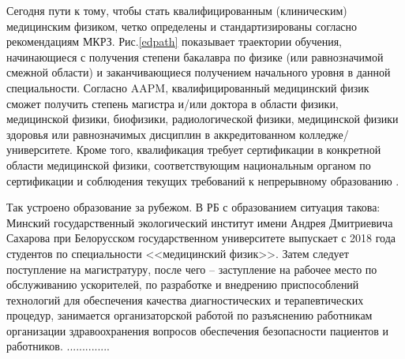 \documentclass[a4paper,10pt]{extarticle}
\begin{document}
Сегодня пути к тому, чтобы стать квалифицированным (клиническим) медицинским физиком, четко определены и стандартизированы согласно рекомендациям МКРЗ. Рис.\ref{edpath} показывает траектории обучения, начинающиеся с получения степени бакалавра по физике (или равнозначимой смежной области) и заканчивающиеся получением начального уровня в данной специальности.
Согласно AAPM, квалифицированный медицинский физик сможет получить степень магистра и/или доктора в области физики, медицинской физики, биофизики, радиологической физики, медицинской физики здоровья или равнозначимых дисциплин в аккредитованном колледже/университете. Кроме того, квалификация требует сертификации в конкретной области медицинской физики, соответствующим национальным органом по сертификации и соблюдения текущих требований к непрерывному образованию \cite{AAPM 2016b}. 

Так устроено образование за рубежом. В РБ с образованием ситуация такова: Минский государственный экологический институт имени Андрея Дмитриевича Сахарова при Белорусском государственном университете выпускает с 2018 года студентов по специальности <<медицинский физик>>. Затем следует поступление на магистратуру, после чего -- заступление на рабочее место по обслуживанию ускорителей, по разработке и внедрению приспособлений технологий для обеспечения качества диагностических и терапевтических процедур, занимается организаторской работой по разъяснению работникам организации здравоохранения вопросов обеспечения безопасности пациентов и работников. ..............






%
\end{document}

